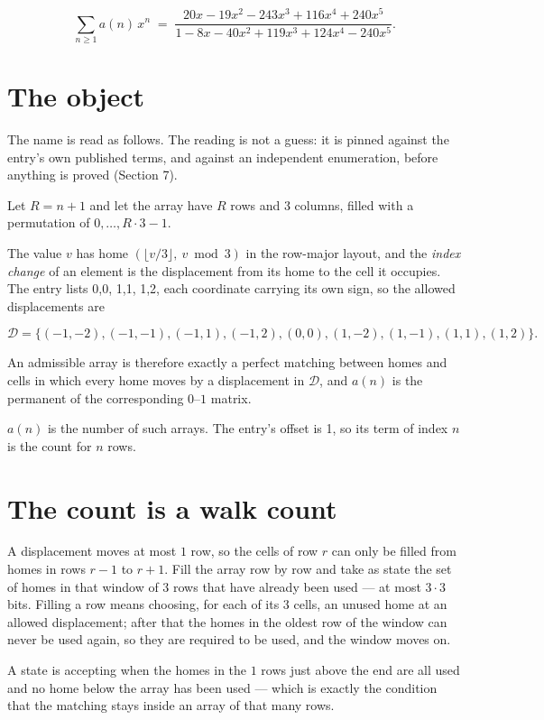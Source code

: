 \documentclass[11pt]{article}
\theoremstyle{definition}
\begin{document}
\[\sum_{n \ge 1} a(n)\,x^n \;=\; \frac{20x - 19x^{2} - 243x^{3} + 116x^{4} + 240x^{5}}{1 - 8x - 40x^{2} + 119x^{3} + 124x^{4} - 240x^{5}}.\]

\section{The object}

The name is read as follows. The reading is not a guess: it is pinned against the entry's own published terms, and against an independent enumeration, before anything is proved (Section 7).

Let $R = n + 1$ and let the array have $R$ rows and $3$ columns, filled with a permutation of $0,\dots,R\cdot3-1$.

The value $v$ has home $(\lfloor v/3\rfloor,\ v \bmod 3)$ in the row-major layout, and the {\itshape index change} of an element is the displacement from its home to the cell it occupies. The entry lists 0,0, 1,1, 1,2, each coordinate carrying its own sign, so the allowed displacements are

\[\mathcal{D} = \{(-1,-2), (-1,-1), (-1,1), (-1,2), (0,0), (1,-2), (1,-1), (1,1), (1,2)\}.\]

An admissible array is therefore exactly a perfect matching between homes and cells in which every home moves by a displacement in $\mathcal{D}$, and $a(n)$ is the permanent of the corresponding $0$--$1$ matrix.

$a(n)$ is the number of such arrays. The entry's offset is 1, so its term of index $n$ is the count for $n$ rows.

\section{The count is a walk count}

A displacement moves at most $1$ row, so the cells of row $r$ can only be filled from homes in rows $r-1$ to $r+1$. Fill the array row by row and take as state the set of homes in that window of $3$ rows that have already been used --- at most $3\cdot3$ bits. Filling a row means choosing, for each of its $3$ cells, an unused home at an allowed displacement; after that the homes in the oldest row of the window can never be used again, so they are required to be used, and the window moves on.

A state is accepting when the homes in the $1$ rows just above the end are all used and no home below the array has been used --- which is exactly the condition that the matching stays inside an array of that many rows.
\end{document}
